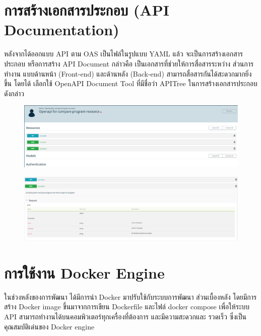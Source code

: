 \section{การสร้างเอกสารประกอบ (API Documentation)}
หลังจากได้ออกแบบ API ตาม OAS เป็นไฟล์ในรูปแบบ YAML แล้ว จะเป็นการสร้างเอกสาร
ประกอบ หรือการสร้าง API Document กล่าวคือ เป็นเอกสารที่ช่วยให้การสื่อสารระหว่าง ส่วนการทํางาน
แบบด้านหน้า (Front-end) และด้านหลัง (Back-end) สามารถสื่อสารกันได้สะดวกมากยิ่งขึ้น โดยได้
เลือกใช้ OpenAPI Document Tool ที่มีชื่อว่า APITree ในการสร้างเอกสารประกอบดังกล่าว

        \begin{figure}[H]
            \centering
                \centering
                \includegraphics[width=5in]{latex/figures/apitree.png}
        \end{figure}
        \begin{figure}[H]
            \centering
                \centering
                \includegraphics[width=5in]{latex/figures/apitree_detail.png}
        \end{figure}
\section{การใช้งาน Docker Engine}
ในช่วงหลังของการพัฒนา ได้มีการนํา Docker \cite{docker} มาปรับใช้กับระบบการพัฒนา
ส่วนเบื้องหลัง โดยมีการสร้าง Docker image ขึ้นมาจากการเขียน Dockerfile และไฟล์ docker compose
\cite{compose} เพื่อให้ระบบ API สามารถทํางานได้บนคอมพิวเตอร์ทุกเครื่องที่ต้องการ และมีความสะดวกและ
รวดเร็ว ซึ่งเป็นคุณสมบัติเด่นของ Docker engine

